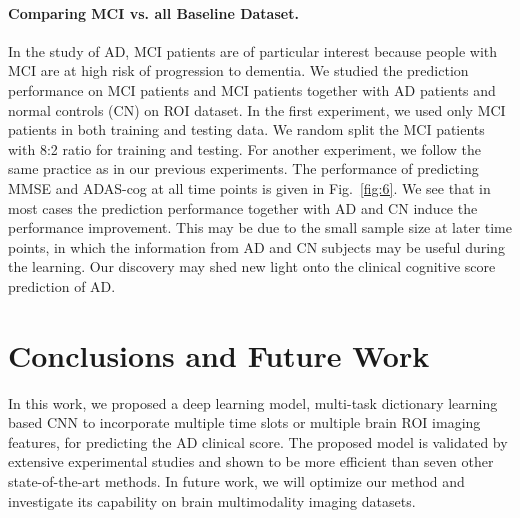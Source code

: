 \documentclass[10pt,twocolumn,letterpaper]{article}
\begin{document}
\paragraph{Comparing MCI vs. all Baseline Dataset.}
In the study of AD, MCI patients are of particular interest because people with MCI are at high risk of progression to dementia. We studied the prediction performance on MCI patients and MCI patients together with AD patients and normal controls (CN) on ROI dataset. In the first experiment, we used only MCI patients in both training and testing data. We random split the MCI patients with 8:2 ratio for training and testing. For another experiment, we follow the same practice as in our previous experiments. The performance of predicting MMSE and ADAS-cog at all time points is given in Fig.~\ref{fig:6}. We see that in most cases the prediction performance together with AD and CN induce the performance improvement. This may be due to the small sample size at later time points, in which the information from AD and CN subjects may be useful during the learning. Our discovery may shed new light onto the clinical cognitive score prediction of AD.
\vspace{-1.5em}
\section{Conclusions and Future Work}
\vspace{-0.5em}
In this work, we proposed a deep learning model, multi-task dictionary learning based CNN to incorporate multiple time slots or multiple brain ROI imaging features, for predicting the AD clinical score. The proposed model is validated by extensive experimental studies and shown to be more efficient than seven other state-of-the-art methods. In future work, we will optimize our method and investigate its capability on brain multimodality imaging datasets.

{\small


}
\end{document}
